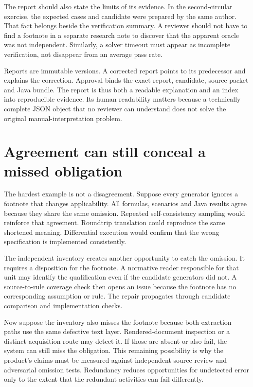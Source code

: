 \documentclass[12pt,a4paper,oneside,openany]{book}
\begin{document}
The report should also state the limits of its evidence. In the second-circular
exercise, the expected cases and candidate were prepared by the same author.
That fact belongs beside the verification summary. A reviewer should not have to
find a footnote in a separate research note to discover that the apparent oracle
was not independent. Similarly, a solver timeout must appear as incomplete
verification, not disappear from an average pass rate.

Reports are immutable versions. A corrected report points to its predecessor and
explains the correction. Approval binds the exact report, candidate, source
packet and Java bundle. The report is thus both a readable explanation and an
index into reproducible evidence. Its human readability matters because a
technically complete JSON object that no reviewer can understand does not solve
the original manual-interpretation problem.

\section{Agreement can still conceal a missed obligation}

The hardest example is not a disagreement. Suppose every generator ignores a
footnote that changes applicability. All formulas, scenarios and Java results
agree because they share the same omission. Repeated self-consistency sampling
would reinforce that agreement. Roundtrip translation could reproduce the same
shortened meaning. Differential execution would confirm that the wrong
specification is implemented consistently.

The independent inventory creates another opportunity to catch the omission. It
requires a disposition for the footnote. A normative reader responsible for that
unit may identify the qualification even if the candidate generators did not.
A source-to-rule coverage check then opens an issue because the footnote has no
corresponding assumption or rule. The repair propagates through candidate
comparison and implementation checks.

Now suppose the inventory also misses the footnote because both extraction paths
use the same defective text layer. Rendered-document inspection or a distinct
acquisition route may detect it. If those are absent or also fail, the system can
still miss the obligation. This remaining possibility is why the product's
claims must be measured against independent source review and adversarial
omission tests. Redundancy reduces opportunities for undetected error only to
the extent that the redundant activities can fail differently.
\end{document}
